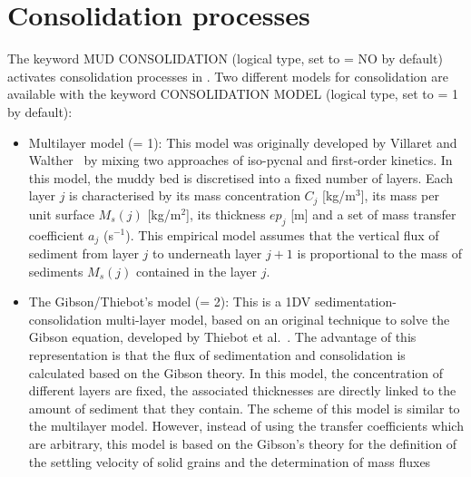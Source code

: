 \section{Consolidation processes}
The keyword {\ttfamily MUD CONSOLIDATION} (logical type, set to {\ttfamily = NO} by default) activates consolidation processes in \sisyphe{}. Two different models for consolidation are available with the keyword {\ttfamily CONSOLIDATION MODEL} (logical type, set to {\ttfamily = 1} by default):
\begin{itemize}
\item Multilayer model ({\ttfamily = 1}): This model was originally developed by Villaret and Walther~\cite{} by mixing two
approaches of iso-pycnal and first-order kinetics. In this model, the muddy bed is discretised into a fixed number of layers.
Each layer $j$ is characterised by its mass concentration $C_j$ [kg/m$^3$], its mass per unit surface $M_s(j)$
[kg/m$^2$], its thickness $ep_j$ [m] and a set of mass transfer coefficient $a_j$ (s$^{-1}$). This empirical model assumes that the vertical flux of
sediment from layer $j$ to underneath layer $j+1$ is proportional to the mass of sediments $M_s(j)$ contained in the layer $j$.

\item The Gibson/Thiebot's model ({\ttfamily = 2}): This is a 1DV sedimentation-consolidation multi-layer model, based on an original
technique to solve the Gibson equation, developed by Thiebot et al.~\cite{thiebot08}. The advantage of
this representation is that the flux of sedimentation and consolidation is calculated based on
the Gibson theory. In this model, the concentration of different layers are fixed, the associated thicknesses are directly
linked to the amount of sediment that they contain. The scheme of this model is similar to the multilayer model.
However, instead of using the transfer coefficients which are
arbitrary, this model is based on the Gibson's theory for the definition of the settling velocity
of solid grains and the determination of mass fluxes
\end{itemize}

